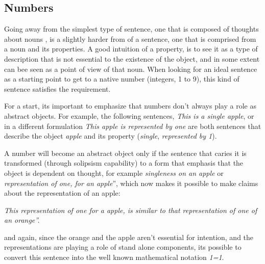 \documentclass[10pt]{article}
\begin{document}
\subsection*{Numbers}
Going away from the simplest type of sentence, one that is  composed of thoughts about nouns , is a slightly harder from of a sentence, one that is comprised from a noun and its  properties. A good intuition of a property, is to see it as a type of description that is not essential to the existence of the object, and in some extent can bee seen as a point of view of that noun. When looking for an ideal sentence as a starting point to get to a native number (integers, 1 to 9), this kind of sentence satisfies the requirement. \par

For a start, its important to emphasize that numbers don’t always play a role as abstract objects. For example, the following sentences, \textit{This is a single apple}, or in a different formulation  \textit{This apple is represented by one}  are both sentences that describe the object \textit{apple} and its property (\textit{single}, \textit{represented by 1}).\par
A number will become an abstract object only if the sentence that caries it is transformed (through solipsism capability) to a form that emphasis that the object is dependent on thought, for example \textit{singleness on an apple} or \textit{representation of one, for an apple}”, which now  makes it possible to  make claims about the representation of an apple: \par
 \textit{This representation of one for a  apple, is similar to that representation of one of an orange”.}
 \par
and again, since the orange and the apple aren't essential  for intention, and the representations are playing a role of stand alone components, its possible to convert this sentence into the well known mathematical notation \textit{1=1}. 
\end{document}
